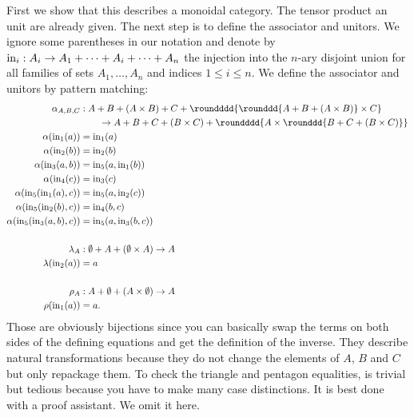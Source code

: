 \begin{answer}
  First we show that this describes a monoidal category.
  The tensor product an unit are already given.
  The next step is to define the associator and unitors.
  We ignore some parentheses in our notation and denote by $\operatorname{in}_i : A_i \to A_1 + \cdots + A_i + \cdots + A_n$ the injection into the $n$-ary disjoint union for all families of sets $A_1, \ldots, A_n$ and indices $1 \leq i \leq n$.
  We define the associator and unitors by pattern matching:
  \begin{align*}
    \alpha_{A, B, C} &: A + B + (A \times B) + C + \roundddd{\rounddd{A + B + (A \times B)} \times C} \\
      &\qquad \to A + B + C + (B \times C) + \roundddd{A \times \rounddd{B + C + (B \times C)}} \\
    \alpha(\myIn_1(a)) &= \myIn_1(a) \\
    \alpha(\myIn_2(b)) &= \myIn_2(b) \\
    \alpha(\myIn_3(a, b)) &= \myIn_5(a, \myIn_1(b)) \\
    \alpha(\myIn_4(c)) &= \myIn_3(c) \\
    \alpha(\myIn_5(\myIn_1(a), c)) &= \myIn_5(a, \myIn_2(c)) \\
    \alpha(\myIn_5(\myIn_2(b), c)) &= \myIn_4(b, c) \\
    \alpha(\myIn_5(\myIn_3(a, b), c)) &= \myIn_5(a, \myIn_3(b, c)) \\
    \\
    \lambda_{A} &: \emptyset + A + (\emptyset \times A) \to A \\
    \lambda(\myIn_2(a)) &= a \\
    \\
    \rho_{A} &: A + \emptyset + (A \times \emptyset) \to A \\
    \rho(\myIn_1(a)) &= a.
  \end{align*}
  Those are obviously bijections since you can basically swap the terms on both sides of the defining equations and get the definition of the inverse.
  They describe natural transformations because they do not change the elements of $A$, $B$ and $C$ but only repackage them.
  To check the triangle and pentagon equalities, is trivial but tedious because you have to make many case distinctions.
  It is best done with a proof assistant.
  We omit it here.


\end{answer}

